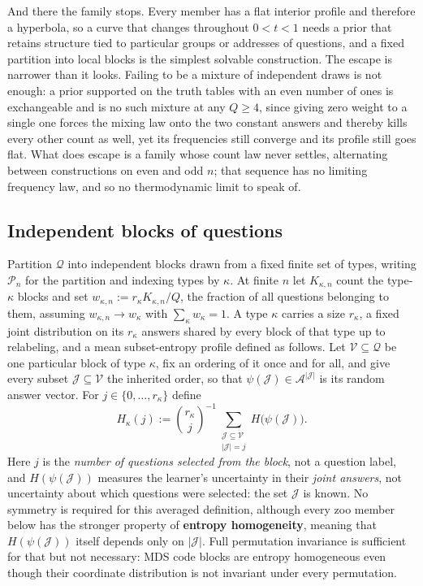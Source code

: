 \documentclass[11pt]{article}
\begin{document}
And there the family stops. Every member has a flat interior profile
and therefore a hyperbola, so a curve that changes throughout
$0 < t < 1$ needs a prior that retains structure tied to particular
groups or addresses of questions, and a fixed partition into local
blocks is the simplest solvable construction. The escape is narrower
than it looks. Failing to be a mixture of independent draws is not
enough: a prior supported on the truth tables with an even number of
ones is exchangeable and is no such mixture at any $Q \ge 4$, since
giving zero weight to a single one forces the mixing law onto the two
constant answers and thereby kills every other count as well, yet its
frequencies still converge and its profile still goes flat. What does
escape is a family whose count law never settles, alternating between
constructions on even and odd $n$; that sequence has no limiting
frequency law, and so no thermodynamic limit to speak of.

\subsection{Independent blocks of questions}

Partition $\mathcal Q$ into independent blocks drawn from a fixed
finite set of types, writing $\mathcal P_n$ for the partition and
indexing types by $\kappa$. At finite $n$ let $K_{\kappa,n}$ count
the type-$\kappa$ blocks and set
$w_{\kappa,n} := r_\kappa K_{\kappa,n}/Q$, the fraction of all
questions belonging to them, assuming $w_{\kappa,n}\to w_\kappa$ with
$\sum_\kappa w_\kappa = 1$. A type $\kappa$ carries a size
$r_\kappa$, a fixed joint distribution on its $r_\kappa$ answers
shared by every block of that type up to relabeling, and a mean
subset-entropy profile defined as follows. Let
$\mathcal V \subseteq \mathcal Q$ be one particular block of type
$\kappa$, fix an ordering of it once and for all, and give every
subset $\mathcal J \subseteq \mathcal V$ the inherited order, so that
$\psi(\mathcal J) \in \mathcal A^{|\mathcal J|}$ is its random answer
vector. For $j \in \{0,\ldots,r_\kappa\}$ define
%
\begin{equation}
  H_\kappa(j)
  := \binom{r_\kappa}{j}^{-1}
  \sum_{\substack{\mathcal J\subseteq\mathcal V\\ |\mathcal J| = j}}
  H\big(\psi(\mathcal J)\big).
  \label{eq:blockprofile}
\end{equation}
%
Here $j$ is the \emph{number of questions selected from the block},
not a question label, and $H(\psi(\mathcal J))$ measures the
learner's uncertainty in their \emph{joint answers}, not uncertainty
about which questions were selected: the set $\mathcal J$ is known.
No symmetry is required for this averaged definition, although every
zoo member below has the stronger property of \textbf{entropy
homogeneity}, meaning that $H(\psi(\mathcal J))$ itself depends only
on $|\mathcal J|$. Full permutation invariance is sufficient for that
but not necessary: MDS code blocks \cite{macwilliams} are entropy homogeneous even
though their coordinate distribution is not invariant under every
permutation.
\end{document}
